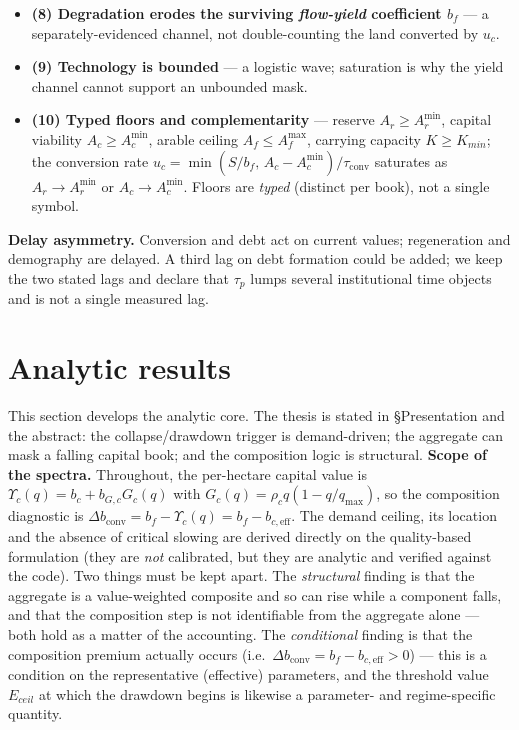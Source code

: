 \documentclass[11pt]{article}
\begin{document}
\begin{itemize}
\item \textbf{(8) Degradation erodes the surviving \emph{flow-yield} coefficient $b_f$} --- a separately-evidenced channel, not double-counting the land converted by $u_c$.
\item \textbf{(9) Technology is bounded} --- a logistic wave; saturation is why the yield channel cannot support an unbounded mask.
\item \textbf{(10) Typed floors and complementarity} --- reserve $A_r\ge A_r^{\min}$, capital viability $A_c\ge A_c^{\min}$, arable ceiling $A_f\le A_f^{\max}$, carrying capacity $K\ge K_{min}$; the conversion rate $u_c=\min(S/b_f,\,A_c-A_c^{\min})/\tau_{\mathrm{conv}}$ saturates as $A_r\to A_r^{\min}$ or $A_c\to A_c^{\min}$. Floors are \emph{typed} (distinct per book), not a single symbol.
\end{itemize}

\textbf{Delay asymmetry.} Conversion and debt act on current values; regeneration and demography are delayed. A third lag on debt formation could be added; we keep the two stated lags and declare that $\tau_p$ lumps several institutional time objects and is not a single measured lag.

\section{Analytic results}

This section develops the analytic core. The thesis is stated in \S Presentation and the abstract: the collapse/drawdown trigger is demand-driven; the aggregate can mask a falling capital book; and the composition logic is structural. \textbf{Scope of the spectra.} Throughout, the per-hectare capital value is $\Upsilon_c(q)=b_c+b_{G,c}G_c(q)$ with $G_c(q)=\rho_c q(1-q/q_{\max})$, so the composition diagnostic is $\Delta b_{\mathrm{conv}}=b_f-\Upsilon_c(q)=b_f-b_{c,\mathrm{eff}}$. The demand ceiling, its location and the absence of critical slowing are derived directly on the quality-based formulation (they are \emph{not} calibrated, but they are analytic and verified against the code). Two things must be kept apart. The \emph{structural} finding is that the aggregate is a value-weighted composite and so can rise while a component falls, and that the composition step is not identifiable from the aggregate alone --- both hold as a matter of the accounting. The \emph{conditional} finding is that the composition premium actually occurs (i.e.\ $\Delta b_{\mathrm{conv}}=b_f-b_{c,\mathrm{eff}}>0$) --- this is a condition on the representative (effective) parameters, and the threshold value $E_{ceil}$ at which the drawdown begins is likewise a parameter- and regime-specific quantity.
\end{document}
